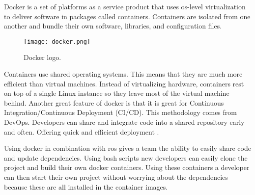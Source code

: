 
Docker is a set of platforms as a service product that uses \acs{os}-level virtualization to deliver software in packages 
called containers. Containers are isolated from one another and bundle their own software, libraries, and configuration files.

\begin{figure}[ht]
    \centering
    \texttt{[image: docker.png]}
    \caption[Docker logo]{Docker logo\footnotemark.}
\end{figure}

Containers use shared operating systems. This means that they are much more efficient than virtual machines. 
Instead of virtualizing hardware, containers rest on top of a single Linux instance so they leave most of the virtual machine behind. 
Another great feature of docker is that it is great for Continuous Integration/Continuous Deployment (CI/CD). 
This methodology comes from DevOps. 
Developers can share and integrate code into a shared repository early and often. Offering quick and efficient deployment \cite{docker:article}.

Using docker in combination with \acs{ros} gives a team the ability to easily share code and update dependencies. 
Using bash scripts new developers can easily clone the project and build their own docker containers. Using these containers 
a developer can then start their own project without worrying about the dependencies because these are all installed in the container images.